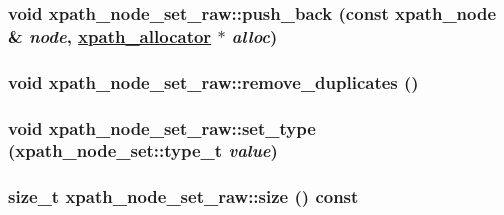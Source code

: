 \hypertarget{classxpath__node__set__raw_676ec123e5be874869c78ff5c43ae9c2}{
\subsubsection[push\_\-back]{\setlength{\rightskip}{0pt plus 5cm}void xpath\_\-node\_\-set\_\-raw::push\_\-back (const xpath\_\-node \& {\em node}, \hyperlink{classxpath__allocator}{xpath\_\-allocator} $\ast$ {\em alloc})}}
\label{classxpath__node__set__raw_676ec123e5be874869c78ff5c43ae9c2}


\hypertarget{classxpath__node__set__raw_f82da6fa8d42f9dff9c55e7b93d96e26}{
\subsubsection[remove\_\-duplicates]{\setlength{\rightskip}{0pt plus 5cm}void xpath\_\-node\_\-set\_\-raw::remove\_\-duplicates ()}}
\label{classxpath__node__set__raw_f82da6fa8d42f9dff9c55e7b93d96e26}


\hypertarget{classxpath__node__set__raw_e73780271d772967f78ddd7b9376cdab}{
\subsubsection[set\_\-type]{\setlength{\rightskip}{0pt plus 5cm}void xpath\_\-node\_\-set\_\-raw::set\_\-type (xpath\_\-node\_\-set::type\_\-t {\em value})}}
\label{classxpath__node__set__raw_e73780271d772967f78ddd7b9376cdab}


\hypertarget{classxpath__node__set__raw_7121a0eb1af207606b9613747834f3bd}{
\subsubsection[size]{\setlength{\rightskip}{0pt plus 5cm}size\_\-t xpath\_\-node\_\-set\_\-raw::size () const}}
\label{classxpath__node__set__raw_7121a0eb1af207606b9613747834f3bd}


